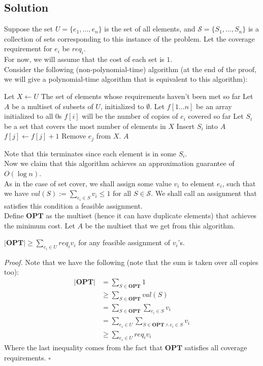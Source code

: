 \documentclass[a4paper]{article}
\newenvironment{proof}{\begin{breakbox}\textit{Proof.}}{\hfill$\square$\end{breakbox}}
\newcommand{\nl}{\vspace{0.2cm}\\}
\newcommand{\OPT}{\mathbf{OPT}}
\begin{document}
\subsection{Solution}
Suppose the set $U = \{e_1, \ldots, e_n\}$ is the set of all elements, and $\mathcal{S} = \{S_1, \ldots, S_n\}$ is a collection of sets corresponding to this instance of the problem. Let the
coverage requirement for $e_i$ be $req_i$.\nl
For now, we will assume that the cost of each set is $1$.\nl
Consider the following (non-polynomial-time) algorithm (at the end of the proof, we will give a polynomial-time algorithm that is equivalent to this algorithm):
\begin{algorithmic}[1]
        \State Let $X \gets U$ \Comment The set of elements whose requirements haven't been met so far
        \State Let $A$ be a multiset of subsets of $U$, initialized to $\emptyset$.
        \State Let $f[1\ldots n]$ be an array initialized to all 0s
        \Comment $f[i]$ will be the number of copies of $e_i$ covered so far
            \State Let $S_i$ be a set that covers the most number of elements in $X$
            \State Insert $S_i$ into $A$
                \State $f[j] \gets f[j] + 1$
                    \State Remove $e_j$ from $X$.
                \EndIf
            \EndFor
        \EndWhile
        \State \Return $A$
    \EndFunction
\end{algorithmic}
Note that this terminates since each element is in some $S_i$.\nl
Now we claim that this algorithm achieves an approximation guarantee of $O(\log n)$.\nl
As in the case of set cover, we shall assign some value $v_i$ to element $e_i$, such that we have $val(S) := \sum_{e_i \in S} v_i \le 1$ for all $S \in \mathcal{S}$. We shall call an assignment
that satisfies this condition a feasible assignment.\nl
Define $\OPT$ as the multiset (hence it can have duplicate elements) that achieves the minimum cost. Let $A$ be the multiset that we get from this algorithm.\nl
\begin{claim}
    $|\OPT| \ge \sum_{e_i \in U} req_i v_i$ for any feasible assignment of $v_i$'s.
\end{claim}
\begin{proof}
    Note that we have the following (note that the sum is taken over all copies too):
    \begin{align*}
        |\OPT| &= \sum_{S \in \OPT} 1\\
               &\ge \sum_{S \in \OPT} val(S)\\
               &= \sum_{S \in \OPT} \sum_{e_i \in S} v_i\\
               &= \sum_{e_i \in U} \sum_{S\in \OPT \land e_i \in S} v_i\\
               &\ge \sum_{e_i \in U} req_i v_i
    \end{align*}
    Where the last inequality comes from the fact that $\OPT$ satisfies all coverage requirements.
\end{proof}
\end{document}
